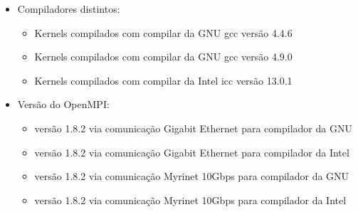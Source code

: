 \documentclass[conference,compsoc]{IEEEtran}
\begin{document}
\begin{itemize}
\item Compiladores distintos:
\begin{itemize}
\item Kernels compilados com compilar da GNU gcc versão 4.4.6
\item Kernels compilados com compilar da GNU gcc versão 4.9.0
\item Kernels compilados com compilar da Intel icc versão 13.0.1
\end{itemize}
\item Versão do OpenMPI:
\begin{itemize}
\item versão 1.8.2 via comunicação Gigabit Ethernet para compilador da GNU
\item versão 1.8.2 via comunicação Gigabit Ethernet para compilador da Intel
\item versão 1.8.2 via comunicação Myrinet 10Gbps para compilador da GNU
\item versão 1.8.2 via comunicação Myrinet 10Gbps para compilador da Intel
\end{itemize}
\end{itemize}



%
%

\end{document}
